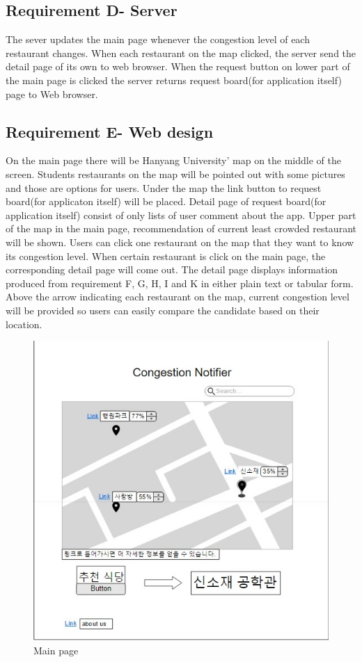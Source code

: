 \documentclass[journal]{IEEEtran}
\begin{document}
\subsection{Requirement D- Server}
The sever updates the main page whenever the congestion level of each restaurant changes. When each restaurant on the map clicked, the server send the detail page of its own to web browser. When the request button on lower part of the main page is clicked the server returns request board(for application itself) page to Web browser.
\subsection{Requirement E- Web design}
On the main page there will be Hanyang University’ map on the middle of the screen. Students restaurants on the map will be pointed out with some pictures and those are options for users. Under the map the link button to request board(for applicaton itself) will be placed. Detail page of request board(for application itself) consist of only lists of user comment about the app.  Upper part of the map in the main page, recommendation of current least crowded restaurant will be shown. Users can click one restaurant on the map that they want to know its congestion level. When certain restaurant is click on the main page, the corresponding detail page will come out. The detail page displays information produced from requirement F, G, H, I and K in either plain text or tabular form. Above the arrow indicating each restaurant on the map, current congestion level will be provided so users can easily compare the candidate based on their location. 

\begin{figure}[h]
\centering
\includegraphics[scale=0.5]{mainpage.jpg}
\caption{Main page}
\label{fig:Main page}
\end{figure}
\end{document}
